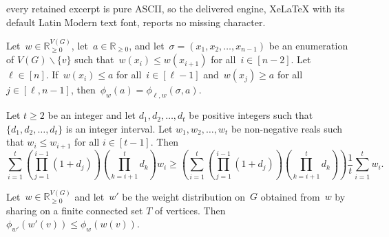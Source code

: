 \documentclass[10pt,a4paper]{amsart}
\let\setminus=\smallsetminus
\newcommand*{\weights}{\ensuremath{\mathbb{R}_{\geq 0}^{V(G)}}}
\begin{document}
every retained excerpt is pure ASCII, so the delivered engine, XeLaTeX with its default Latin Modern text font, reports no missing character.
\begin{lem}
    \label{lem-order2}
    Let~${w \in \weights}$, let~${a \in \mathbb{R}_{\geq 0}}$, and let~${\sigma = (x_1, x_2, \ldots, x_{n-1})}$ be an enumeration of ${V(G) \setminus \{v\}}$ 
    such that~${w(x_i) \leq w(x_{i+1})}$ for all~${i \in [n-2]}$. 
    Let~${\ell\in [n]}$. 
    If~${w(x_{i}) \leq a}$ for all~${i \in [\ell-1]}$ and~${w(x_j) \geq a}$ for all~${j \in [\ell, n-1]}$, 
    then~${\phi_w(a) = \phi_{\ell, w}(\sigma, a)}$.
\end{lem}

\begin{lem}
    \label{lem-ineq}
    Let $t\ge2$ be an integer
    and 
    let $d_1,d_2,\ldots,d_t$ be positive integers such that $\{ d_1,d_2,\ldots,d_t\}$ is an integer interval. 
    Let $w_1,w_2,\ldots,w_t$ be non-negative reals such that 
    $w_i\le w_{i+1}$ for all $i\in [t-1]$.
    Then
    \[ 
    \sum_{i=1}^t \left(\prod_{j=1}^{i-1} (1+d_j)\right)\left( \prod_{k=i+1}^t d_k\right)w_i
    \ge \left( \sum_{i=1}^t \left(\prod_{j=1}^{i-1} (1+d_j)\right)\left( \prod_{k=i+1}^t d_k\right)\right)\frac1t \sum_{i=1}^t w_i .
    \] 
\end{lem}

\begin{lem} \label{lem:strongphi}
    Let~${w \in \weights}$ and let~$w'$ be the weight distribution on~$G$ obtained from~$w$ by sharing on a finite connected set $T$ of vertices.
    Then~${\phi_{w'}(w'(v)) \leq \phi_{w}(w(v))}$. 
\end{lem}
\end{document}
